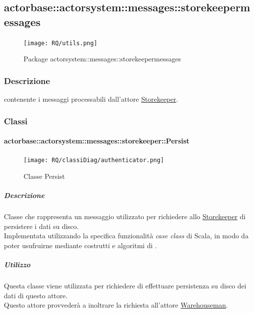 \documentclass{scalatekids-article}
\begin{document}

\subsection{actorbase::actorsystem::messages::storekeepermessages}
\label{sec:actorbase::actorsystem::messages::storekeepermessages}

\begin{figure}[H]
  \begin{center}
    \texttt{[image: RQ/utils.png]}
    \caption{Package actorsystem::messages::storekeepermessages}
  \end{center}
\end{figure}

\subsubsection{Descrizione}
 contenente i messaggi processabili dall'attore \hyperref[sec:actorbase::actorsystem::actors::storekeeper::Storekeeper]{Storekeeper}.

\subsubsection{Classi}

\paragraph{actorbase::actorsystem::messages::storekeeper::Persist}
\label{sec:actorbase::actorsystem::messages::storekeeper::Persist}

\begin{figure}[H]
  \begin{center}
    \texttt{[image: RQ/classiDiag/authenticator.png]}
    \caption{Classe Persist}
  \end{center}
\end{figure}

\subparagraph{Descrizione}
Classe che rappresenta un messaggio utilizzato per richiedere allo
\hyperref[sec:actorbase::actorsystem::actors::storekeeper::Storekeeper]{Storekeeper} di persistere i dati su disco.\\Implementata utilizzando la specifica funzionalità \textit{case class} di Scala,
in modo da poter usufruirne mediante costrutti e algoritmi di
.

\subparagraph{Utilizzo}
Questa classe viene utilizzata per richiedere di effettuare persistenza su disco dei dati di questo attore.\\Questo attore provvederà a inoltrare la richiesta
all'attore \hyperref[sec:actorbase::actorsystem::actors::warehouseman::Warehouseman]{Warehouseman}.
\end{document}
